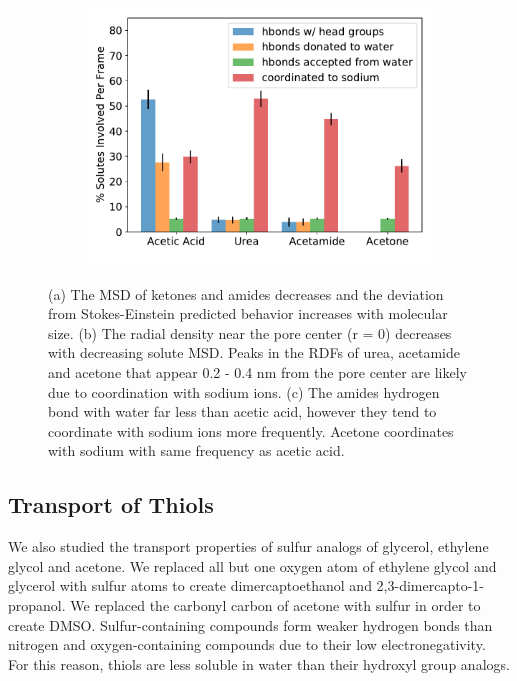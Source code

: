 \documentclass[journal=jpcbfk,manuscript=article]{achemso}
\begin{document}
\begin{figure}[!htb]
\begin{subfigure}{0.325\textwidth}
  \includegraphics[width=\textwidth]{ketone_hbonds.pdf}  %
  \caption{}\label{fig:ketone_hbonds}
  \end{subfigure}
  \caption{(a) The MSD of ketones and amides decreases and the deviation from
  Stokes-Einstein predicted behavior increases with molecular size.
  (b) The radial density near the pore center (r = 0) decreases with decreasing
  solute MSD. Peaks in the RDFs of urea, acetamide and acetone that appear 
  0.2 - 0.4 nm from the pore center are likely due to coordination with sodium
  ions. (c) The amides hydrogen bond with water far less than acetic acid, 
  however they tend to coordinate with sodium ions more frequently. Acetone
  coordinates with sodium with same frequency as acetic acid.}\label{fig:ketones}
  \end{figure}
  
  \subsection{Transport of Thiols}
  
  We also studied the transport properties of sulfur analogs of glycerol,
  ethylene glycol and acetone. We replaced all but one oxygen atom of 
  ethylene glycol and glycerol with sulfur atoms to create dimercaptoethanol
  and 2,3-dimercapto-1-propanol. We replaced the carbonyl carbon of acetone
  with sulfur in order to create DMSO. Sulfur-containing compounds form weaker
  hydrogen bonds than nitrogen and oxygen-containing compounds due to their
  low electronegativity.~\cite{biswal_hydrogen_2015} For this reason, thiols
  are less soluble in water than their hydroxyl group analogs.
  
\end{document}
